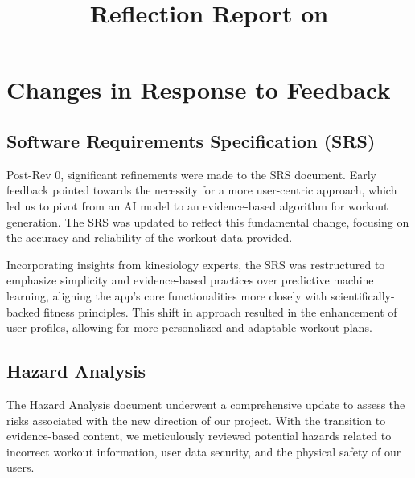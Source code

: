 \documentclass{article}
\title{Reflection Report on \progname}
\author{\authname}
\date{}
\begin{document}
\maketitle


\section{Changes in Response to Feedback}



\subsection{Software Requirements Specification (SRS)}
Post-Rev 0, significant refinements were made to the SRS document. Early feedback pointed towards the necessity for a more user-centric approach, which led us to pivot from an AI model to an evidence-based algorithm for workout generation. The SRS was updated to reflect this fundamental change, focusing on the accuracy and reliability of the workout data provided.

Incorporating insights from kinesiology experts, the SRS was restructured to emphasize simplicity and evidence-based practices over predictive machine learning, aligning the app's core functionalities more closely with scientifically-backed fitness principles. This shift in approach resulted in the enhancement of user profiles, allowing for more personalized and adaptable workout plans.

\subsection{Hazard Analysis}
The Hazard Analysis document underwent a comprehensive update to assess the risks associated with the new direction of our project. With the transition to evidence-based content, we meticulously reviewed potential hazards related to incorrect workout information, user data security, and the physical safety of our users.
\end{document}
